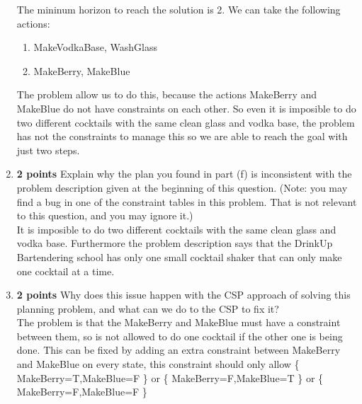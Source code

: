 \documentclass{article}
\def\ans#1{{\color{ans}#1}}
\begin{document}
\begin{enumerate}[label=(\alph*)]
    \ans{
        The mininum horizon to reach the solution is 2. We can take the following actions:
        \begin{enumerate}[label=\arabic{*}.]
            \item MakeVodkaBase, WashGlass
            \item MakeBerry, MakeBlue
        \end{enumerate}
        The problem allow us to do this, because the actions MakeBerry and MakeBlue do not have 
        constraints on each other. So even it is imposible to do two different 
        cocktails with the same clean glass and vodka base, the problem has not the constraints to 
        manage this so we are able to reach the goal with just two steps.
    }
    \item \textbf{2 points} Explain why the plan you found in part (f) is inconsistent with the problem description given at the beginning of this question. (Note: you may find a bug in one of the constraint tables in this problem. That is not relevant to this question, and you may ignore it.)\\
    \ans{
        It is imposible to do two different cocktails with the same clean glass and vodka base. Furthermore 
        the problem description says that the DrinkUp Bartendering school has only one small 
        cocktail shaker that can only make one cocktail at a time. 
    }
    \item \textbf{2 points} Why does this issue happen with the CSP approach of solving this planning problem, and what can we do to the CSP to fix it?\\
    \ans{
        The problem is that the MakeBerry and MakeBlue must have a constraint between them, so  
        is not allowed to do one cocktail if the other one is being done. This can be fixed by adding 
        an extra constraint between MakeBerry and MakeBlue on every state, this constraint should 
        only allow \{ MakeBerry=T,MakeBlue=F \} or \{ MakeBerry=F,MakeBlue=T \} or \{ MakeBerry=F,MakeBlue=F \}
    }
\end{enumerate}

\clearpage
\end{document}
